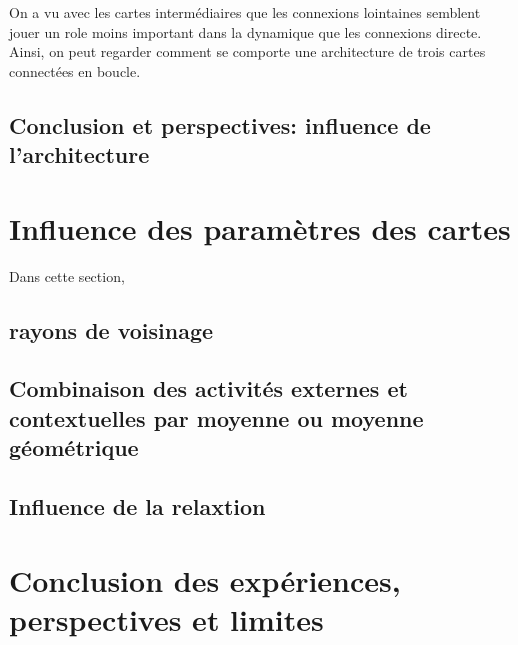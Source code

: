 On a vu avec les cartes intermédiaires que les connexions lointaines semblent jouer un role moins important dans la dynamique que les connexions directe. Ainsi, on peut regarder comment se comporte une architecture de trois cartes connectées en boucle. 


\subsection{Conclusion et perspectives: influence de l'architecture}

\section{Influence des paramètres des cartes}

Dans cette section, 

\subsection{rayons de voisinage}

\subsection{Combinaison des activités externes et contextuelles par moyenne ou moyenne géométrique}

\subsection{Influence de la relaxtion}

\section{Conclusion des expériences, perspectives et limites}
